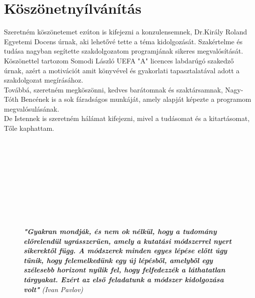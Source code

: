 \documentclass[tocnopagenum]{thesis-ekf}
\theoremstyle{definition}
\theoremstyle{remark}
\begin{document}
	\chapter*{Köszönetnyílvánítás}
	Szeretném köszönetemet ezúton is kifejezni a konzulensemnek, Dr.Király Roland Egyetemi Docens úrnak, aki lehetővé tette a téma kidolgozását.
	Szakértelme és tudása nagyban segítette szakdolgozatom programjának sikeres megvalósítását.
	\\
    Köszönettel tartozom Somodi László UEFA "A" licences labdarúgó szakedző úrnak, azért a motivációt amit könyvével és gyakorlati tapasztalatával adott a szakdolgozat megírásához. 
	\\
	Továbbá, szeretném megköszönni, kedves barátomnak és szaktársamnak, Nagy-Tóth Bencének is a sok fáradságos munkáját, amely alapját képezte a programom megvalósulásának. 
	\\
	De Istennek is szeretném hálámat kifejezni, mivel a tudásomat és a kitartásomat, Tőle kaphattam. 
	\\
	\\
	\\
	\\
	\\
	\\
	\\
	\\
	\\
	\\
	\begin{figure}[H]	
	\centering
	\textbf{\textit{"Gyakran mondják, és nem ok nélkül, hogy a tudomány előrelendül ugrásszerűen, amely a kutatási módszerrel nyert sikerektől függ. A módszerek minden egyes lépése előtt úgy tűnik, hogy felemelkedünk egy új lépésből, amelyből egy szélesebb horizont nyílik fel, hogy felfedezzék a láthatatlan tárgyakat. Ezért az első feladatunk a módszer kidolgozása volt"}}
	\textit{ (Ivan Pavlov)}
	\end{figure}



	
	

	\listoffigures
	
\end{document}

